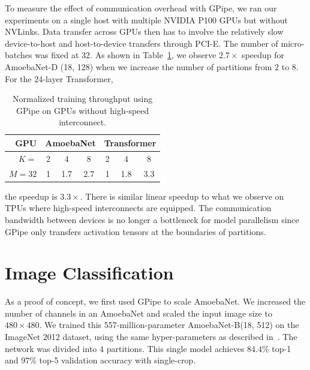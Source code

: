 \documentclass{article}
\def\codename{GPipe}
\begin{document}
To measure the effect of communication overhead with \codename{}, we ran our experiments on a single host with multiple NVIDIA P100 GPUs but without NVLinks. Data transfer across GPUs then has to involve the relatively slow device-to-host and host-to-device transfers through PCI-E. The number of micro-batches was fixed at 32. As shown in Table~\ref{results_comm_tab}, we observe $2.7\times$ speedup for AmoebaNet-D (18, 128) when we increase the number of partitions from $2$ to $8$. For the $24$-layer Transformer,
\begin{table}
\begin{small}
\begin{center}
\caption{Normalized training throughput using \codename{} on GPUs without high-speed interconnect.}
\label{results_comm_tab}
\begin{tabular}{rcccccc}
\toprule
GPU & \multicolumn{3}{c}{AmoebaNet} & \multicolumn{3}{c}{Transformer}  \\
 \midrule
 $K=$ & 2 & 4 & 8 & 2 & 4 & 8\\\hline
 $M=32$ & 1 & 1.7 & 2.7 &  1 & 1.8 & 3.3 \\
\bottomrule
\end{tabular}
\end{center}
\end{small}
\end{table}
the speedup is $3.3\times$. There is similar linear speedup to what we observe on TPUs where high-speed interconnects are equipped. The communication bandwidth between devices is no longer a bottleneck for model parallelism since \codename{} only transfers activation tensors at the boundaries of partitions. 

\section{Image Classification}
\label{section:imagenet_results}
As a proof of concept, we first used \codename{} to scale AmoebaNet. We increased the number of channels in an AmoebaNet and scaled the input image size to $480\times480$. We trained this 557-million-parameter AmoebaNet-B(18, 512) on the ImageNet 2012 dataset, using the same hyper-parameters as described in~\cite{real2018regularized}. The network was divided into 4 partitions. This single model achieves $84.4\%$ top-1 and $97\%$ top-5 validation accuracy with single-crop.
\end{document}
